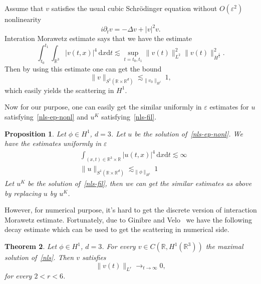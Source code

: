 \documentclass[10pt,a4paper]{article}
\newtheorem{theorem}{Theorem}[section]
\newtheorem{proposition}[theorem]{Proposition}
\begin{document}
  Assume that \(v\) satisfies the usual cubic Schr\"odinger equation without 
  \(O(\varepsilon^2)\) nonlinearity
  \begin{equation}\label{nls}
    i\partial_t v = -\Delta v + |v|^2 v.
  \end{equation}
  Interation Morawetz estimate says that we have the estimate 
  \[ \int_{t_0}^{t_1}\int_{\mathbb R^3} |v(t,x)|^4\,\mathrm{d}x\mathrm{d}t
  \lesssim \sup_{t=t_0,t_1} \|v(t)\|^2_{L^2}\|v(t)\|^2_{\dot{H}^\frac12}.\]
  Then by using this estimate one can get the bound 
  \[ \|v\|_{S^1(\mathbb R\times\mathbb R^d)} \lesssim_{\|v_0\|_{H^1}} 1,\]
  which easily yields the scattering in \(H^1\).

  Now for our purpose, one can easily get the similar uniformly in
  \(\varepsilon\) estimates for \(u\) satisfying~\eqref{nls-ep-nonl} and
  \(u^K\) satisfying~\eqref{nls-fil}. 
  \begin{proposition}\label{S1}
    Let \(\phi \in H^1\), \( d = 3 \). Let \( u \) be the solution 
    of~\eqref{nls-ep-nonl}. We have the estimates uniformly in \(\varepsilon\)
    \begin{equation}
      \begin{aligned}
        & \int_{(x,t)\in\mathbb R^3\times\mathbb R} |u(t,x)|^4\,\mathrm{d}x\mathrm{d}t
        \lesssim \infty \\ 
        & \|u\|_{S^1(\mathbb R\times\mathbb R^d)} \lesssim_{\|\phi\|_{H^1}} 1
      \end{aligned}
    \end{equation}
    Let \(u^K\) be the solution of~\eqref{nls-fil}, then we can get the similar
    estimates as above by replacing \(u\) by \(u^K\).
  \end{proposition}

  However, for numerical purpose, it's hard to get the discrete version of
  interaction Morawetz estimate. Fortunately, due to Ginibre and
  Velo~\cite{GiVl85b} we have the following decay estimate which can be used to
  get the scattering in numerical side. 
  \begin{theorem}
    Let \(\phi \in H^1\), \( d = 3 \). For every \(v\in C(\mathbb R,H^1(\mathbb
    R^3))\) the maximal solution of~\eqref{nls}. Then \(v\) satisfies 
    \[ \|v(t)\|_{L^r} \to_{t \to \infty} 0, \]
    for every \(2 < r < 6\).
  \end{theorem}
\end{document}
